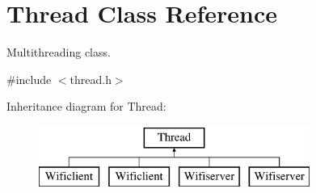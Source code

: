 \hypertarget{class_thread}{\section{Thread Class Reference}
\label{class_thread}
}


Multithreading class.  




{\ttfamily \#include $<$thread.\-h$>$}

Inheritance diagram for Thread\-:\begin{figure}[H]
\begin{center}
\leavevmode
\includegraphics[height=2.000000cm]{class_thread}
\end{center}
\end{figure}
